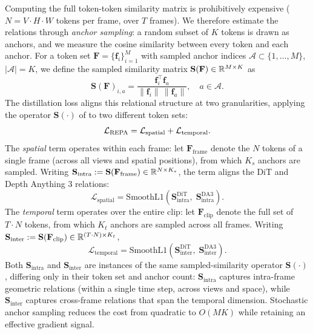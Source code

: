 Computing the full token-token similarity matrix is prohibitively expensive ($N{=}V\!\cdot\!H\!\cdot\!W$ tokens per frame, over $T$ frames). We therefore estimate the relations through \emph{anchor sampling}: a random subset of $K$ tokens is drawn as anchors, and we measure the cosine similarity between every token and each anchor. For a token set $\mathbf{F} = \{\mathbf{f}_i\}_{i=1}^{M}$ with sampled anchor indices $\mathcal{A} \subset \{1,\dots,M\}$, $|\mathcal{A}| = K$, we define the sampled similarity matrix $\mathbf{S}(\mathbf{F}) \in \mathbb{R}^{M \times K}$ as
\begin{equation}
\label{eq:sampled-sim}
\mathbf{S}(\mathbf{F})_{i,a} = \frac{\mathbf{f}_i^\top \mathbf{f}_{a}}{\|\mathbf{f}_i\| \, \|\mathbf{f}_{a}\|}, \quad a \in \mathcal{A}.
\end{equation}
The distillation loss aligns this relational structure at two granularities, applying the operator $\mathbf{S}(\cdot)$ of  to two different token sets:
\begin{equation}
\label{eq:3d-repa}
\mathcal{L}_{\text{REPA}} = \mathcal{L}_{\text{spatial}} + \mathcal{L}_{\text{temporal}}.
\end{equation}
The \emph{spatial} term operates within each frame: let $\mathbf{F}_{\text{frame}}$ denote the $N$ tokens of a single frame (across all views and spatial positions), from which $K_s$ anchors are sampled. Writing $\mathbf{S}_{\text{intra}} := \mathbf{S}(\mathbf{F}_{\text{frame}}) \in \mathbb{R}^{N \times K_s}$, the term aligns the DiT and Depth Anything 3 relations:
\begin{equation}
\mathcal{L}_{\text{spatial}} = \text{SmoothL1}\!\left(\mathbf{S}_{\text{intra}}^{\text{DiT}},\; \mathbf{S}_{\text{intra}}^{\text{DA3}}\right).
\end{equation}
The \emph{temporal} term operates over the entire clip: let $\mathbf{F}_{\text{clip}}$ denote the full set of $T\!\cdot\!N$ tokens, from which $K_t$ anchors are sampled across all frames. Writing $\mathbf{S}_{\text{inter}} := \mathbf{S}(\mathbf{F}_{\text{clip}}) \in \mathbb{R}^{(T \cdot N) \times K_t}$,
\begin{equation}
\mathcal{L}_{\text{temporal}} = \text{SmoothL1}\!\left(\mathbf{S}_{\text{inter}}^{\text{DiT}},\; \mathbf{S}_{\text{inter}}^{\text{DA3}}\right).
\end{equation}
Both $\mathbf{S}_{\text{intra}}$ and $\mathbf{S}_{\text{inter}}$ are instances of the same sampled-similarity operator $\mathbf{S}(\cdot)$, differing only in their token set and anchor count: $\mathbf{S}_{\text{intra}}$ captures intra-frame geometric relations (within a single time step, across views and space), while $\mathbf{S}_{\text{inter}}$ captures cross-frame relations that span the temporal dimension. Stochastic anchor sampling reduces the cost from quadratic to $O(MK)$ while retaining an effective gradient signal.

